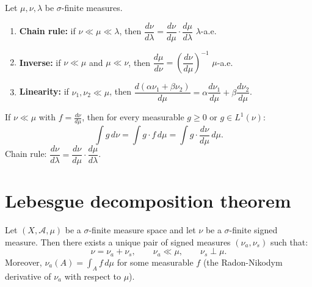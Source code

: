 \begin{proposition}
\label{prop:rn_props}
Let $\mu, \nu, \lambda$ be $\sigma$-finite measures.
\begin{enumerate}
    \item \textbf{Chain rule:} if $\nu \ll \mu \ll \lambda$, then
    $\dfrac{d\nu}{d\lambda} = \dfrac{d\nu}{d\mu} \cdot \dfrac{d\mu}{d\lambda}$
    $\lambda$-a.e.
    \item \textbf{Inverse:} if $\nu \ll \mu$ and $\mu \ll \nu$, then
    $\dfrac{d\mu}{d\nu} = \left(\dfrac{d\nu}{d\mu}\right)^{-1}$ $\mu$-a.e.
    \item \textbf{Linearity:} if $\nu_1, \nu_2 \ll \mu$, then
    $\dfrac{d(\alpha\nu_1 + \beta\nu_2)}{d\mu} = \alpha\dfrac{d\nu_1}{d\mu}
    + \beta\dfrac{d\nu_2}{d\mu}$.
\end{enumerate}
\end{proposition}

\begin{keyformulas}[title=\textbf{Key Radon-Nikodym formulas}]
If $\nu \ll \mu$ with $f = \frac{d\nu}{d\mu}$, then for every measurable $g \geq 0$
or $g \in L^1(\nu)$:
\[
    \int g\, d\nu = \int g \cdot f\, d\mu = \int g \cdot \frac{d\nu}{d\mu}\, d\mu.
\]
Chain rule: $\dfrac{d\nu}{d\lambda} = \dfrac{d\nu}{d\mu} \cdot \dfrac{d\mu}{d\lambda}$.
\end{keyformulas}

\section{Lebesgue decomposition theorem}

\begin{theorem}
\label{thm:lebesgue_decomp}
Let $(X, \mathcal{A}, \mu)$ be a $\sigma$-finite measure space and let $\nu$ be a
$\sigma$-finite signed measure. Then there exists a unique pair of signed measures
$(\nu_a, \nu_s)$ such that:
\[
    \nu = \nu_a + \nu_s, \qquad \nu_a \ll \mu, \qquad \nu_s \perp \mu.
\]
Moreover, $\nu_a(A) = \int_A f\, d\mu$ for some measurable $f$ (the Radon-Nikodym
derivative of $\nu_a$ with respect to $\mu$).
\end{theorem}

